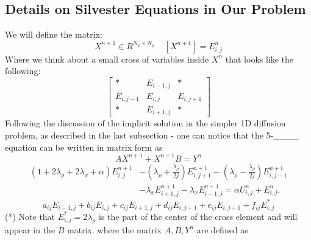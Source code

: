 \documentclass{article}
\begin{document}
\subsection*{Details on Silvester Equations in Our Problem}
We will define the matrix:
\begin{equation}
    X^{n+1}\in {R}^{N_x\times N_{\rho}}\;\;\;\;[X^{n+1}]=E_{i,j}^n
\end{equation}
Where we think about a small cross of variables inside $X^n$ that looks like the following:
\begin{equation}
    \begin{bmatrix}
        * & E_{i-1,j} & * \\
        E_{i,j-1} & E_{i,j} & E_{i,j+1} \\
        * & E_{i+1,j} & *
    \end{bmatrix}
\end{equation}
Following the discussion of the implicit solution in the simpler 1D diffusion problem, as described in the last subsection - one can notice that the 5-\_\_\_\_ equation can be written in matrix form as
\begin{equation}
    AX^{n+1}+X^{n+1}B=Y^n
\end{equation}
    \begin{equation}
\begin{split}
(1 + 2\lambda_{\rho} + 2\lambda_x + \alpha)E^{n+1}_{i,j} & - (\lambda_{\rho} + \frac{\lambda_{\rho}}{2j})E^{n+1}_{i,j+1} - (\lambda_{\rho} - \frac{\lambda_{\rho}}{2j})E^{n+1}_{i,j-1} \\
& - \lambda_x E^{n+1}_{i+1,j} - \lambda_x E^{n+1}_{i-1,j} = \alpha U^{n}_{i,j} + E^{n}_{i,j},
\end{split}
\end{equation}
\begin{equation}
    a_{ij}E_{i-1,j}+b_{ij}E_{i,j}+c_{ij}E_{i+1,j}+d_{ij}E_{i,j+1}+e_{ij}E_{i,j+1}+f_{ij}E_{i,j}^*
\end{equation}
(*) Note that $E_{i,j}^*=2\lambda_\rho$  is the part of the center of the cross element and will appear in the $B$ matrix.
where the matrix $A,B,Y^n$ are defined as
\end{document}
